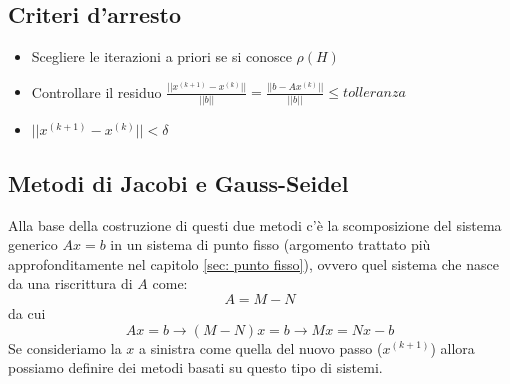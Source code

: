 \documentclass[12pt,a4paper,]{report}
\begin{document}
\subsection{Criteri d'arresto}
\begin{itemize}
    \item Scegliere le iterazioni a priori se si conosce $\rho(H)$
    \item Controllare il residuo $\frac{||x^{(k+1)}-x^{(k)}||}{||b||}=\frac{||b-Ax^{(k)}||}{||b||}\leq tolleranza$
    \item $||x^{(k+1)}-x^{(k)}||< \delta$ 
\end{itemize}
\subsection{Metodi di Jacobi e Gauss-Seidel}

Alla base della costruzione di questi due metodi c'è la scomposizione del sistema generico $Ax = b$ in un sistema di punto fisso (argomento trattato più approfonditamente nel capitolo \autoref{sec: punto fisso}), ovvero quel sistema che nasce da una riscrittura di $A$ come:
\[
A = M - N 
\]
da cui
\[
Ax = b \longrightarrow (M - N)x = b \longrightarrow Mx = Nx -b
\]
Se consideriamo la $x$ a sinistra come quella del nuovo passo ($x^{(k+1)}$) allora possiamo definire dei metodi basati su questo tipo di sistemi.
\end{document}
